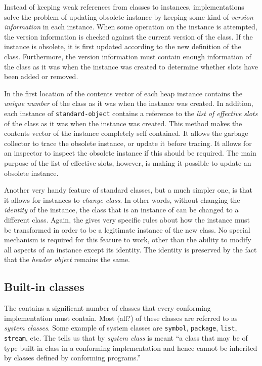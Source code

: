 Instead of keeping weak references from classes to instances,
implementations solve the problem of updating obsolete instance by
keeping some kind of \emph{version information} in each instance.
When some operation on the instance is attempted, the version
information is checked against the current version of the class.  If
the instance is obsolete, it is first updated according to the new
definition of the class.  Furthermore, the version information must
contain enough information of the class as it was when the instance
was created to determine whether slots have been added or removed.

In \sysname{} the first location of the contents vector of each heap
instance contains the \emph{unique number} of the class as it was when
the instance was created.  In addition, each instance of
\texttt{standard-object} contains a reference to the \emph{list of
  effective slots} of the class as it was when the instance was
created.  This method makes the contents vector of the instance
completely self contained.  It allows the garbage collector to trace
the obsolete instance, or update it before tracing.  It allows for an
inspector to inspect the obsolete instance if this should be required.
The main purpose of the list of effective slots, however, is making it
possible to update an obsolete instance.

Another very handy feature of standard classes, but a much simpler
one, is that it allows for instances to \emph{change class}.  In other
words, without changing the \emph{identity} of the instance, the class
that is an instance of can be changed to a different class.  Again,
the \hs{} gives very specific rules about how the instance must be
transformed in order to be a legitimate instance of the new class.  No
special mechanism is required for this feature to work, other than the
ability to modify all aspects of an instance except its identity.  The
identity is preserved by the fact that the \emph{header object}
remains the same. 

\subsection{Built-in classes}
\label{object-system-built-in-classes}

The \hs{} contains a significant number of classes that every
conforming implementation must contain.  Most (all?) of these classes
are referred to as \emph{system classes}.  Some example of system
classes are \texttt{symbol}, \texttt{package}, \texttt{list},
\texttt{stream}, etc.  The \hs{} tells us that by \emph{system
  class} is meant ``a class that may be of type built-in-class in a
conforming implementation and hence cannot be inherited by classes
defined by conforming programs.'' 

